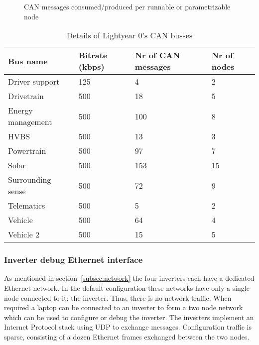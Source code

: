 \begin{figure}[htb]
    \centering
    
    \caption{CAN messages consumed/produced per runnable or parametrizable node}
    \label{fig:produce_consume_CAN_runnable}
\end{figure}

\begin{table}[htb]
    \centering
    \begin{tabular}{@{}llll@{}}
    \toprule
    Bus name          & Bitrate (kbps) & Nr of CAN messages & Nr of nodes \\ \midrule
    Driver support    & 125            & 4                  & 2           \\
    Drivetrain        & 500            & 18                 & 5           \\
    Energy management & 500            & 100                & 8           \\
    HVBS              & 500            & 13                 & 3           \\
    Powertrain        & 500            & 97                 & 7           \\
    Solar             & 500            & 153                & 15          \\
    Surrounding sense & 500            & 72                 & 9           \\
    Telematics        & 500            & 5                  & 2           \\
    Vehicle           & 500            & 64                 & 4           \\
    Vehicle 2         & 500            & 15                 & 5           \\ \bottomrule
    \end{tabular}
    \caption{Details of Lightyear 0's CAN busses}
    \label{tab:can_busses}
\end{table}

\subsubsection{Inverter debug Ethernet interface}
As mentioned in section~\ref{subsec:network} the four inverters each have a dedicated Ethernet network. In the default configuration these networks have only a single node connected to it: the inverter. Thus, there is no network traffic. When required a laptop can be connected to an inverter to form a two node network which can be used to configure or debug the inverter. The inverters implement an Internet Protocol stack using UDP to exchange messages. Configuration traffic is sparse, consisting of a dozen Ethernet frames exchanged between the two nodes.

